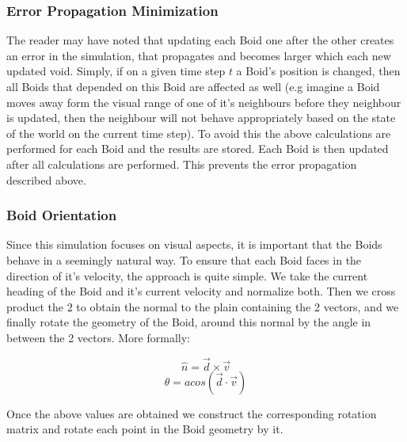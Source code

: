 \documentclass[12pt]{article}
\begin{document}
\subsubsection{Error Propagation Minimization}
The reader may have noted that updating each Boid one after the other creates an error in the simulation, that propagates and becomes larger which each new updated void. Simply, if on a given time step $t$ a Boid's position is changed, then all Boids that depended on this Boid are affected as well (e.g imagine a Boid moves away form the visual range of one of it's neighbours before they neighbour is updated, then the neighbour will not behave appropriately based on the state of the world on the current time step). To avoid this the above calculations are performed for each Boid and the results are stored.  Each Boid is then updated after all calculations are performed. This prevents the error propagation described above.

\subsubsection{Boid Orientation}
Since this simulation focuses on visual aspects, it is important that the Boids behave in a seemingly natural way. To ensure that each Boid faces in the direction of it's velocity, the approach is quite simple. We take the current heading of the Boid and it's current velocity and normalize both. Then we cross product the 2 to obtain the normal to the plain containing the 2 vectors, and we finally rotate the geometry of the Boid, around this normal by the angle in between the 2 vectors. More formally:

$$\hat{n}=\vec{d}\times \vec{v}$$
$$\theta = acos(\vec{d}\cdot\vec{v})$$

Once the above values are obtained we construct the corresponding rotation matrix and rotate each point in the Boid geometry by it.
\end{document}
